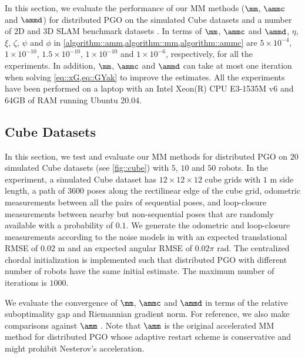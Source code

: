 
In this section, we evaluate the performance of our MM methods ($\mm$, $\ammc$ and $\ammd$) for distributed PGO on the simulated \textsf{\small Cube} datasets and a number of 2D and 3D SLAM benchmark datasets \cite{rosen2016se}.  In terms of $\mm$, $\ammc$ and $\ammd$, $\eta$, $\xi$, $\zeta$, $\psi$ and $\phi$ in \cref{algorithm::amm,algorithm::mm,algorithm::ammc} are $5\times10^{-4}$, $1\times10^{-10}$, $1.5\times 10^{-10}$, $1\times 10^{-10}$ and $1\times10^{-6}$, respectively, for all the experiments. In addition, $\mm$, $\ammc$ and $\ammd$ can  take at most one iteration when solving \cref{eq::xG,eq::GYak} to improve the estimates.   All the experiments have been performed on a laptop with an Intel Xeon(R) CPU E3-1535M v6 and 64GB of RAM running Ubuntu 20.04.



\vspace{-0.5em}


\subsection{\textsf{\small Cube} Datasets}




In this section, we test and evaluate our MM methods for distributed PGO on $20$ simulated \textsf{\small Cube} datasets (see \cref{fig::cube})  with $5$, $10$ and $50$ robots. In the experiment, a simulated {\sf\small Cube} dataset has $12 \times 12 \times 12$ cube grids with $1$ m side length, a path of $3600$ poses along the rectilinear edge of the cube grid, odometric measurements between all the pairs of sequential poses, and loop-closure measurements between nearby but non-sequential poses that are randomly available with a probability of $0.1$. We generate the odometric and loop-closure measurements according to the noise models in \cite{rosen2016se} with an expected translational RMSE  of $0.02$ m and an expected angular RMSE of $0.02\pi$ rad. The centralized chordal initialization \cite{carlone2015initialization} is implemented such that distributed PGO with different number of robots have the same initial estimate. The maximum number of iterations is $1000$. 



We evaluate the convergence of $\mm$, $\ammc$ and $\ammd$ in terms of the relative suboptimality gap and Riemannian gradient norm. For reference, we also make comparisons against $\amm$ \cite{fan2020mm}. Note that $\amm$ is the original accelerated MM method for distributed PGO whose adaptive restart scheme is conservative and might  prohibit Nesterov's acceleration.


